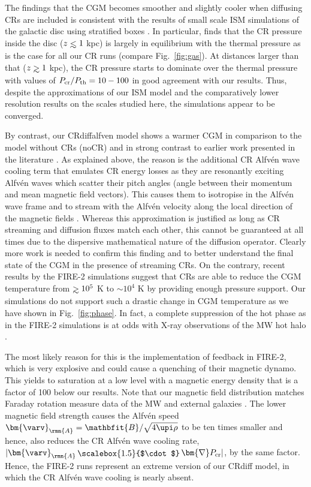 \documentclass[useAMS,usenatbib]{mnras}
\def\lesssim{\mathrel{\hbox{\rlap{\hbox{\lower4pt\hbox{$\sim$}}}\hbox{$<$}}}}
\def\gtrsim{\mathrel{\hbox{\rlap{\hbox{\lower4pt\hbox{$\sim$}}}\hbox{$>$}}}}
\newcommand{\bnabla}{\bm{\nabla}}
\newcommand{\CR}{\mathrm{cr}}
\newcommand{\bvel}{\ensuremath{\bm{\varv}}}
\newcommand{\bB}{\ensuremath{\mathbfit{B}}}
\newcommand{\bcdot}{\ensuremath{\mathchoice {\mskip\thinmuskip\lower0.2ex\hbox{\scalebox{1.5}{$\cdot$}}\mskip\thinmuskip}}{\mskip\thinmuskip\lower0.2ex\hbox{\scalebox{1.5}{$\cdot$}}\mskip\thinmuskip}{\lower0.3ex\hbox{\scalebox{1.2}{$\cdot$}}}{\lower0.3ex\hbox{\scalebox{1.2}{$\cdot$}}}}
\begin{document}
The findings that the CGM becomes smoother and slightly cooler when diffusing CRs are included is consistent with the results of small scale ISM simulations of the galactic disc using stratified boxes \citep{Girichidis2016,Girichidis2018,Simpson2016}. In particular, \citet{Girichidis2018} finds that the CR pressure inside the disc ($z\lesssim1$ kpc) is largely in equilibrium with the thermal pressure as is the case for all our CR runs (compare Fig.\ \ref{fig:gas}). At distances larger than that ($z\gtrsim1$ kpc), the CR pressure starts to dominate over the thermal pressure with values of $P_{\rm cr}/P_{\rm th}=10-100$ in good agreement with our results. Thus, despite the approximations of our ISM model and the comparatively lower resolution results on the scales studied here, the simulations appear to be converged.

By contrast, our CRdiffalfven model shows a warmer CGM in comparison to the model without CRs (noCR) and in strong contrast to earlier work presented in the literature \citep[e.g.][]{Salem2014b,Salem2016,Chen2016}. As explained above, the reason is the additional CR Alfv\'en wave cooling term that emulates CR energy losses as they are resonantly exciting Alfv\'en waves which scatter their pitch angles (angle between their momentum and mean magnetic field vectors). This causes them to isotropise in the Alfv\'en wave frame and to stream with the Alfv\'en velocity along the local direction of the magnetic fields \citep{Wiener2017}. Whereas this approximation is justified as long as CR streaming and diffusion fluxes match each other, this cannot be guaranteed at all times due to the dispersive mathematical nature of the diffusion operator. Clearly more work is needed to confirm this finding and to better understand the final state of the CGM in the presence of streaming CRs. On the contrary, recent results by the FIRE-2 simulations suggest that CRs are able to reduce the CGM temperature from $\gtrsim10^5$ K to $\sim10^4$ K \citep[see figure 7 in][]{Ji2019} by providing enough pressure support. Our simulations do not support such a drastic change in CGM temperature as we have shown in Fig.\ \ref{fig:phase}. In fact, a complete suppression of the hot phase as in the FIRE-2 simulations is at odds with X-ray observations of the MW hot halo \citep[$\sim10^6$ K,][]{Fang2013,Faerman2017}. 

The most likely reason for this is the implementation of feedback in FIRE-2, which is very explosive and could cause a quenching of their magnetic dynamo. This yields to saturation at a low level with a magnetic energy density that is a factor of 100 below our results. Note that our magnetic field distribution matches Faraday rotation measure data of the MW and external galaxies \citep{Pakmor2018}. The lower magnetic field strength causes the Alfv\'en speed $\bvel_{\rmn{A}}=\bB/\sqrt{4\upi\rho}$ to be ten times smaller and hence, also reduces the CR Alfv\'en wave cooling rate, $|\bvel_{\rmn{A}}\bcdot\bnabla P_\CR|$, by the same factor. Hence, the FIRE-2 runs represent an extreme version of our CRdiff model, in which the CR Alfv\'en wave cooling is nearly absent.
\end{document}

